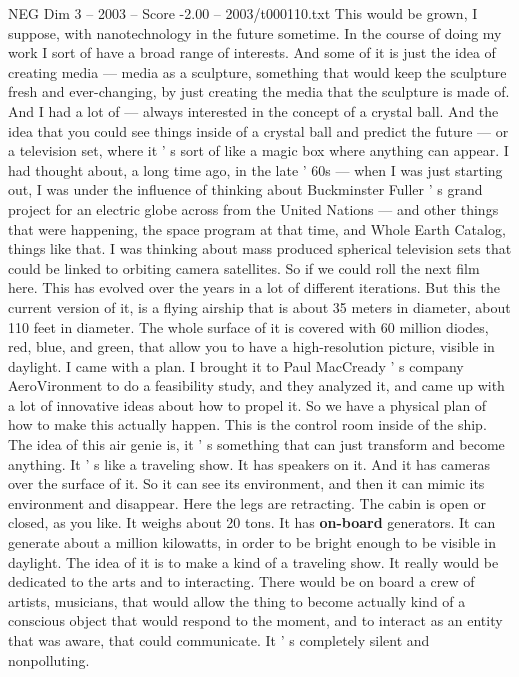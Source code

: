 \begin{textsample}{NEG Dim 3 – 2003 – Score -2.00 – 2003/t000110.txt}
This would be grown, I suppose, with nanotechnology in the future sometime.
In the course of doing my work I sort of have a broad range of interests.
And some of it is just the idea of creating media — media as a sculpture, something that would keep the sculpture fresh and ever-changing, by just creating the media that the sculpture is made of.
And I had a lot of — always interested in the concept of a crystal ball.
And the idea that you could see things inside of a crystal ball and predict the future — or a television set, where it ' s sort of like a magic box where anything can appear.
I had thought about, a long time ago, in the late ' 60s — when I was just starting out, I was under the influence of thinking about Buckminster Fuller ' s grand project for an electric globe across from the United Nations — and other things that were happening, the space program at that time, and Whole Earth Catalog, things like that.
I was thinking about mass produced spherical television sets that could be linked to orbiting camera satellites.
So if we could roll the next film here.
This has evolved over the years in a lot of different iterations.
But this the current version of it, is a flying airship that is about 35 meters in diameter, about 110 feet in diameter.
The whole surface of it is covered with 60 million diodes, red, blue, and green, that allow you to have a high-resolution picture, visible in daylight.
I came with a plan.
I brought it to Paul MacCready ' s company AeroVironment to do a feasibility study, and they analyzed it, and came up with a lot of innovative ideas about how to propel it.
So we have a physical plan of how to make this actually happen.
This is the control room inside of the ship.
The idea of this air genie is, it ' s something that can just transform and become anything.
It ' s like a traveling show.
It has speakers on it.
And it has cameras over the surface of it.
So it can see its environment, and then it can mimic its environment and disappear.
Here the legs are retracting.
The cabin is open or closed, as you like.
It weighs about 20 tons.
It has \textbf{on-board} generators.
It can generate about a million kilowatts, in order to be bright enough to be visible in daylight.
The idea of it is to make a kind of a traveling show.
It really would be dedicated to the arts and to interacting.
There would be on board a crew of artists, musicians, that would allow the thing to become actually kind of a conscious object that would respond to the moment, and to interact as an entity that was aware, that could communicate.
It ' s completely silent and nonpolluting.

\end{textsample}
